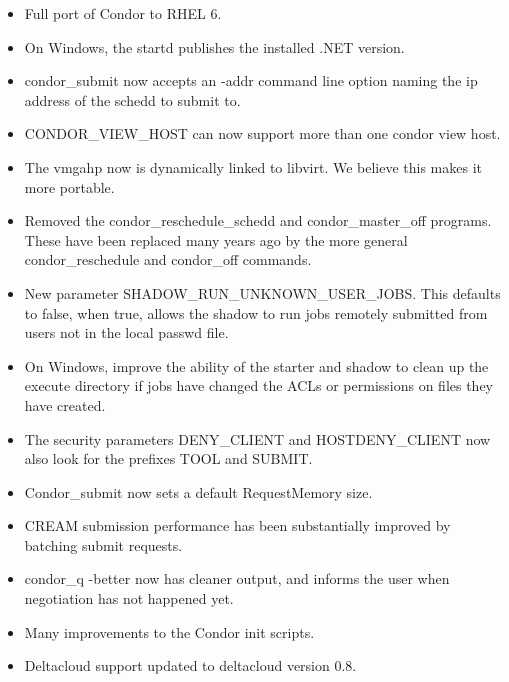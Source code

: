 \begin{itemize}

\item Full port of Condor to RHEL 6.

\item On Windows, the startd publishes the installed
.NET version.

\item condor\_submit now accepts an -addr command line option
naming the ip address of the schedd to submit to.

\item CONDOR\_VIEW\_HOST can now support more than one condor view host.

\item The vmgahp now is dynamically linked to libvirt.  We believe
this makes it more portable.

\item Removed the condor\_reschedule\_schedd and condor\_master\_off
programs.  These have been replaced many years ago by the more general
condor\_reschedule and condor\_off commands.

\item New parameter SHADOW\_RUN\_UNKNOWN\_USER\_JOBS.  This defaults
to false, when true, allows the shadow to run jobs remotely submitted
from users not in the local passwd file.
 
\item On Windows, improve the ability of the starter and shadow
to clean up the execute directory if jobs have changed the ACLs
or permissions on files they have created.

\item The security parameters DENY\_CLIENT and HOSTDENY\_CLIENT
now also look for the prefixes TOOL and SUBMIT.

\item Condor\_submit now sets a default RequestMemory size.

\item CREAM submission performance has been substantially
improved by batching submit requests.

\item condor\_q -better now has cleaner output, and informs
the user when negotiation has not happened yet.

\item Many improvements to the Condor init scripts.

\item Deltacloud support updated to deltacloud version 0.8.


\end{itemize}

